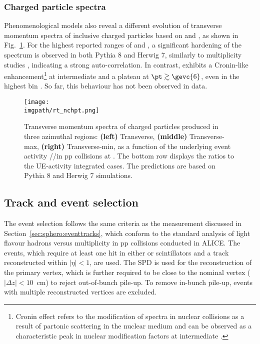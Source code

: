 \subsubsection{Charged particle \pt spectra}

Phenomenological models also reveal a different evolution of transverse momentum spectra of inclusive charged particles based on \RTmin and \RTmax, as shown in Fig.~\ref{fig:rt:nchpt}. For the highest reported ranges of \RTmax and \RT, a significant hardening of the spectrum is observed in both Pythia 8 and Herwig 7, similarly to multiplicity studies \cite{alicecollaborationMultiplicityDependenceLightflavor2019}, indicating a strong auto-correlation. In contrast, \RTmin exhibits a Cronin-like enhancement\footnote{Cronin effect refers to the modification of \pt spectra in nuclear collisions as a result of partonic scattering in the nuclear medium and can be observed as a characteristic peak in nuclear modification factors at intermediate \pt \cite{kopeliovichCroninEffectHadron2002}.} at intermediate \pt and a plateau at $\pt \gtrsim \gevc{6}$, even in the highest \RTmin bin \cite{bencediDisentanglingHardGluon2021}. So far, this behaviour has not been observed in data.

\begin{figure}%
\texttt{[image: \\imgpath/rt\_nchpt.png]}
\caption{Transverse momentum spectra of charged particles produced in three azimuthal regions: \textbf{(left)} Transverse, \textbf{(middle)} Transverse-max, \textbf{(right)} Transverse-min, as a function of the underlying event activity \RT/\RTmax/\RTmin in pp collisions at . The bottom row displays the ratios to the UE-activity integrated cases. The predictions are based on Pythia 8 and Herwig 7 simulations. \cite{bencediDisentanglingHardGluon2021}}
\label{fig:rt:nchpt}
\end{figure}

\subsection{Track and event selection}

The event selection follows the same criteria as the \SOPT measurement discussed in Section~\ref{sec:sphero:eventtracks}, which conform to the standard analysis of light flavour hadrons versus multiplicity in pp collisions conducted in ALICE. The \INELgtO events, which require at least one hit in either \VOA or \VOC scintillators and a track reconstructed within $|\eta|<1$, are used. The SPD is used for the reconstruction of the primary vertex, which is further required to be close to the nominal vertex ($|\Delta z|<10$~cm) to reject out-of-bunch pile-up. To remove in-bunch pile-up, events with multiple reconstructed vertices are excluded.

